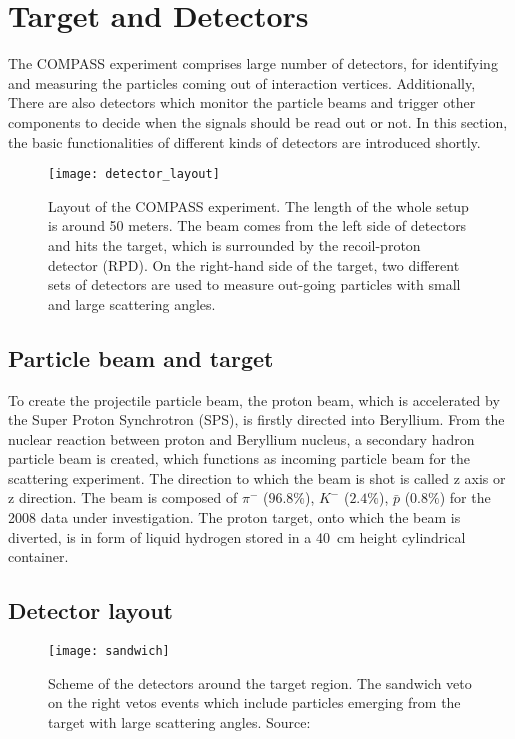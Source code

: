 \section{Target and Detectors}
The COMPASS experiment comprises large number of detectors, for identifying and measuring the particles coming out of interaction vertices. Additionally, There are also detectors which monitor the particle beams and trigger other components to decide when the signals should be read out or not. In this section, the basic functionalities of different kinds of detectors are introduced shortly. 

\begin{figure*}[!ht]
	\centering
	\texttt{[image: detector\_layout]}
	\caption{Layout of the COMPASS experiment. The length of the whole setup is around 50 meters. The beam comes from the left side of detectors and hits the target, which is surrounded by the recoil-proton detector (RPD). On the right-hand side of the target, two different sets of detectors are used to measure out-going particles with small and large scattering angles.\cite{Henri}}
	\label{fig:detec_layout}	
\end{figure*}

\subsection{Particle beam and target}
To create the projectile particle beam, the proton beam, which is accelerated by the Super Proton Synchrotron (SPS), is firstly directed into Beryllium. From the nuclear reaction between proton and Beryllium nucleus, a secondary hadron particle beam is created, which functions as incoming particle beam for the scattering experiment. The direction to which the beam is shot is called z axis or z direction. The beam is composed of $\pi^-$ ($96.8\%$), $K^-$ ($2.4\%$), $\bar{p}$ ($0.8\%$) for the 2008 data under investigation\cite{Henri}. The proton target, onto which the beam is diverted, is in form of liquid hydrogen stored in a \SI{40}{\centi\meter} height cylindrical container. 

\subsection{Detector layout}
\label{subsec:Detector_layout}
\begin{figure}[!th]
	\centering
	\texttt{[image: sandwich]}
	\caption{Scheme of the detectors around the target region. The sandwich veto on the right vetos events which include particles emerging from the target with large scattering angles. Source: \cite{sandwich}}
	\label{fig:sandwich}
\end{figure}

